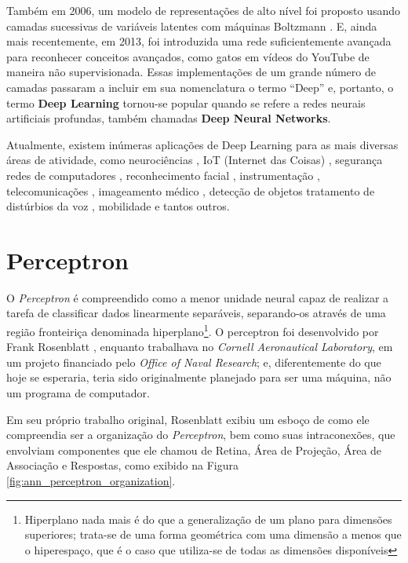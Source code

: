 Também em 2006, um modelo de representações de alto nível foi proposto usando camadas sucessivas de variáveis latentes com máquinas Boltzmann \citep{hinton2006fast}. E, ainda mais recentemente, em 2013, foi introduzida uma rede suficientemente avançada para reconhecer conceitos avançados, como gatos em vídeos do YouTube \citep{le2013building} de maneira não supervisionada. Essas implementações de um grande número de camadas passaram a incluir em sua nomenclatura o termo ``Deep'' e, portanto, o termo \textbf{Deep Learning} tornou-se popular quando se refere a redes neurais artificiais profundas, também chamadas \textbf{Deep Neural Networks}.

Atualmente, existem inúmeras aplicações de Deep Learning para as mais diversas áreas de atividade, como neurociências \citep{Varatharajan2018}, IoT (Internet das Coisas) \citep{8396317}, segurança redes de computadores \citep{8291134}, reconhecimento facial \citep{8253595}, instrumentação \citep{8319916}, telecomunicações \citep{8359094}, imageamento médico \citep{8359121}, detecção de objetos \citep{8253582} tratamento de distúrbios da voz \citep{8337897}, mobilidade \citep{8344803} e tantos outros.



\section{Perceptron}
\label{sec:ann_perceptron}

O \textit{Perceptron} é compreendido como a menor unidade neural capaz de realizar a tarefa de classificar dados linearmente separáveis, separando-os através de uma região fronteiriça denominada hiperplano\footnote{Hiperplano nada mais é do que a generalização de um plano para dimensões superiores; trata-se de uma forma geométrica com uma dimensão a menos que o hiperespaço, que é o caso que utiliza-se de todas as dimensões disponíveis}. O perceptron foi desenvolvido por Frank Rosenblatt \citep{rosenblatt1958perceptron}, enquanto trabalhava no \textit{Cornell Aeronautical Laboratory}, em um projeto financiado pelo \textit{Office of Naval Research}; e, diferentemente do que hoje se esperaria, teria sido originalmente planejado para ser uma máquina, não um programa de computador.

Em seu próprio trabalho original, Rosenblatt exibiu um esboço de como ele compreendia ser a organização do \textit{Perceptron}, bem como suas intraconexões, que envolviam componentes que ele chamou de Retina, Área de Projeção, Área de Associação e Respostas, como exibido na Figura \ref{fig:ann_perceptron_organization}.


